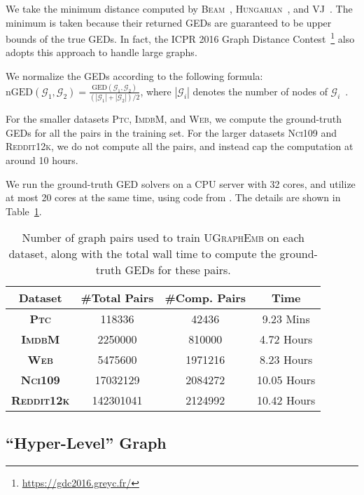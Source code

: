 \documentclass{article}
\newcommand{\model}{\textsc{UGraphEmb}\xspace}
\newcommand{\ptc}{\textsc{Ptc}\xspace}
\newcommand{\imdb}{\textsc{ImdbM}\xspace}
\newcommand{\web}{\textsc{Web}\xspace}
\newcommand{\nci}{\textsc{Nci109}\xspace}
\newcommand{\reddit}{\textsc{Reddit12k}\xspace}
\begin{document}
We take the minimum distance computed by \textsc{Beam}~\cite{neuhaus2006fast}, \textsc{Hungarian}~\cite{riesen2009approximate}, and \textsc{VJ}~\cite{fankhauser2011speeding}. The minimum is taken because their returned GEDs are guaranteed to be upper bounds of the true GEDs. In fact, the ICPR 2016 Graph Distance Contest~\footnote{\url{https://gdc2016.greyc.fr/}} also adopts this approach to handle large graphs.

We normalize the GEDs according to the following formula: $\mathrm{nGED}(\mathcal{G}_1,\mathcal{G}_2)=\frac{\mathrm{GED}(\mathcal{G}_1,\mathcal{G}_2)} {(|\mathcal{G}_1| + |\mathcal{G}_2|) / 2}$, where $|\mathcal{G}_i|$ denotes the number of nodes of $\mathcal{G}_i$~\cite{qureshi2007graph}.





For the smaller datasets \ptc, \imdb, and \web, we compute the ground-truth GEDs for all the pairs in the training set. For the larger datasets \nci and \reddit, we do not compute all the pairs, and instead cap the computation at around 10 hours.

We run the ground-truth GED solvers on a CPU server with 32 cores, and utilize at most 20 cores at the same time, using code from \cite{riesen2013novel}. The details are shown in Table~\ref{table:training_pair_preparation}.


\begin{table}[H]
\small
\begin{tabular}
{cccc} \hline
\textbf{Dataset} & \textbf{\#Total Pairs} & \textbf{\#Comp. Pairs} & \textbf{Time} \\ \hline
\textbf{\ptc} & 118336 & 42436 & 9.23 Mins \\
\textbf{\imdb} & 2250000 & 810000 & 4.72 Hours \\
\textbf{\web} & 5475600 & 1971216 & 8.23 Hours \\
\textbf{\nci} & 17032129 & 2084272 & 10.05 Hours \\
\textbf{\reddit} & 142301041 & 2124992 & 10.42 Hours \\
\hline
\end{tabular}
\centering
\caption{Number of graph pairs used to train \model on each dataset, along with the total wall time to compute the ground-truth GEDs for these pairs.}
\label{table:training_pair_preparation}
\end{table}

\subsection{``Hyper-Level'' Graph}
\end{document}
